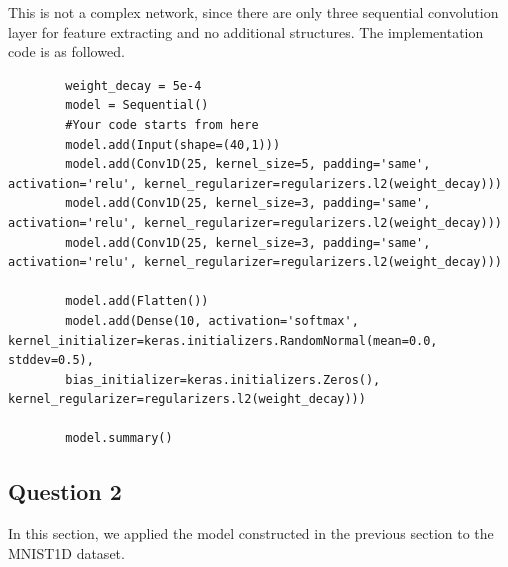 \documentclass[conference]{IEEEtran}
\begin{document}
	This is not a complex network, since there are only three sequential convolution layer for feature extracting and no additional structures. The implementation code is as followed.
	
	\begin{lstlisting}
		weight_decay = 5e-4
		model = Sequential()
		#Your code starts from here 
		model.add(Input(shape=(40,1)))
		model.add(Conv1D(25, kernel_size=5, padding='same', activation='relu', kernel_regularizer=regularizers.l2(weight_decay)))
		model.add(Conv1D(25, kernel_size=3, padding='same', activation='relu', kernel_regularizer=regularizers.l2(weight_decay)))
		model.add(Conv1D(25, kernel_size=3, padding='same', activation='relu', kernel_regularizer=regularizers.l2(weight_decay)))
		
		model.add(Flatten())
		model.add(Dense(10, activation='softmax', kernel_initializer=keras.initializers.RandomNormal(mean=0.0, stddev=0.5),
		bias_initializer=keras.initializers.Zeros(), kernel_regularizer=regularizers.l2(weight_decay)))
		
		model.summary()
	\end{lstlisting}
	
	\subsection{Question 2}
	
	In this section, we applied the model constructed in the previous section to the MNIST1D dataset.\par
	
\end{document}
